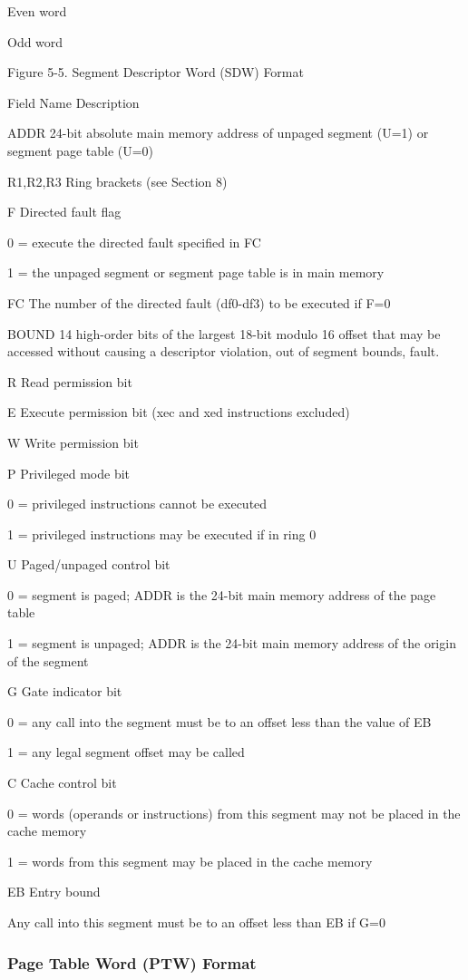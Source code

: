Even word

Odd word

Figure 5-5. Segment Descriptor Word (SDW) Format


Field Name Description

ADDR 24-bit absolute main memory address of unpaged segment (U=1) or segment
page table (U=0)

R1,R2,R3 Ring brackets (see Section 8)

F Directed fault flag

0 = execute the directed fault specified in FC

1 = the unpaged segment or segment page table is in main memory

FC The number of the directed fault (df0-df3) to be executed if F=0

BOUND 14 high-order bits of the largest 18-bit modulo 16 offset that may be
accessed without causing a descriptor violation, out of segment bounds, fault.  

R Read permission bit

E Execute permission bit (xec and xed instructions excluded)

W Write permission bit

P Privileged mode bit

0 = privileged instructions cannot be executed

1 = privileged instructions may be executed if in ring 0

U Paged/unpaged control bit

0 = segment is paged; ADDR is the 24-bit main memory address of the page table

1 = segment is unpaged; ADDR is the 24-bit main memory address of the origin of the segment

G Gate indicator bit

0 = any call into the segment must be to an offset less than the value of EB

1 = any legal segment offset may be called

C Cache control bit

0 = words (operands or instructions) from this segment may not be placed in the
cache memory

1 = words from this segment may be placed in the cache memory

EB Entry bound

Any call into this segment must be to an offset less than EB if G=0


\subsubsection{Page Table Word (PTW) Format}

